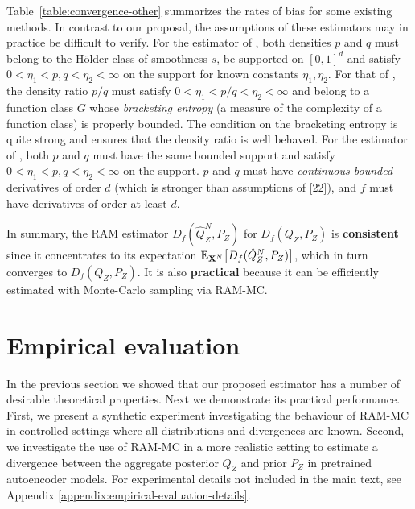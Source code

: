 Table~\ref{table:convergence-other} summarizes the rates of bias for some existing methods.
In contrast to our proposal, the assumptions of these estimators may in practice be difficult to verify.
For the estimator of \cite{krishnamurthy14icml}, both densities $p$ and $q$ must belong to the H\"older class of smoothness $s$, be supported on $[0,1]^d$ and satisfy $0<\eta_1 < p, q < \eta_2<\infty$ on the support for known constants $\eta_1, \eta_2$.
For that of \cite{nguyen10ratio}, the density ratio $p/q$ must satisfy $0<\eta_1 < p/q < \eta_2<\infty$ and belong to a function class $G$ whose \emph{bracketing entropy} (a measure of the complexity of a function class) is properly bounded. The condition on the bracketing entropy is quite strong and ensures that the density ratio is well behaved.
For the estimator of \cite{moon14ensemble}, both $p$ and $q$ must have the same bounded support and satisfy $0<\eta_1 < p, q < \eta_2<\infty$ on the support. $p$ and $q$ must have \emph{continuous bounded} derivatives of order $d$ (which is stronger than assumptions of [22]), and $f$ must have derivatives of order at least $d$.

In summary, the RAM estimator $D_f(\hat{Q}_Z^N , P_Z)$ for $D_f(Q_Z , P_Z)$ is \textbf{consistent} since it concentrates to its expectation $\mathbb{E}_{\mathbf{X}^N}\bigl[D_f(\hat{Q}_Z^N , P_Z)\bigr]$, which in turn converges to $D_f(Q_Z , P_Z)$.
It is also \textbf{practical} because it can be efficiently estimated with Monte-Carlo sampling via RAM-MC.

\section{Empirical evaluation}\label{sec:experiments}

In the previous section we showed that our proposed estimator has a number of desirable theoretical properties.
Next we demonstrate its practical performance.
First, we present a synthetic experiment investigating the behaviour of RAM-MC in controlled settings where all distributions and divergences are known.
Second, we investigate the use of RAM-MC in a more realistic setting to estimate a divergence between the aggregate posterior $Q_Z$ and prior $P_Z$ in pretrained autoencoder models. 
For experimental details not included in the main text,
see Appendix \ref{appendix:empirical-evaluation-details}.


